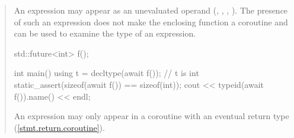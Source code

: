 \begin{quote}

\enternote
An  expression may appear as an unevaluated operand (, , , ). The presence of such an  expression does not make the enclosing function a coroutine and can be used to examine the type of an  expression.
 
\enterexample
\begin{codeblock}	
std::future<int> f();
	
int main() {
  using t = decltype(await f()); // t is int
  static_assert(sizeof(await f()) == sizeof(int));
  cout << typeid(await f()).name() << endl;
}
\end{codeblock}
\exitexample%
\exitnote


\pnum
An  expression may only appear in a coroutine 
with an eventual return type (\ref{stmt.return.coroutine}).

\end{quote}